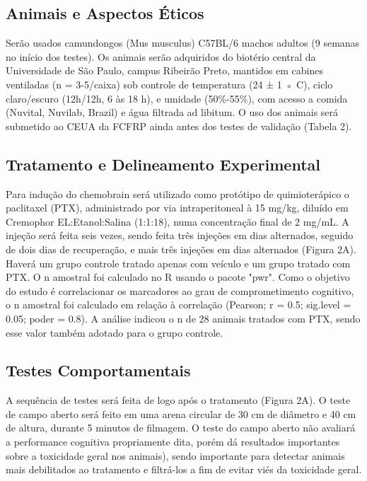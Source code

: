\documentclass[12pt,a4paper]{article}
\begin{document}
	
\subsection{Animais e Aspectos Éticos} \indent
	
Serão usados camundongos (Mus musculus) C57BL/6 machos adultos (9 semanas no início dos testes). Os animais serão adquiridos do biotério central da Universidade de São Paulo, campus Ribeirão Preto, mantidos em cabines ventiladas (n = 3-5/caixa) sob controle de temperatura (24 ± 1 ◦ C), ciclo claro/escuro (12h/12h, 6 às 18 h), e umidade (50\%-55\%), com acesso a comida (Nuvital, Nuvilab, Brazil) e água filtrada ad libitum. O uso dos animais será submetido ao CEUA da FCFRP ainda antes dos testes de validação (Tabela 2). \\
		
	
\subsection{Tratamento e Delineamento Experimental} \indent

Para indução do chemobrain será utilizado como protótipo de quimioterápico o paclitaxel (PTX), administrado por via intraperitoneal à 15 mg/kg, diluído em Cremophor EL:Etanol:Salina (1:1:18), numa concentração final de 2 mg/mL. A injeção será feita seis vezes, sendo feita três injeções em dias alternados, seguido de dois dias de recuperação, e mais três injeções em dias alternados (Figura 2A). \\
	
Haverá um grupo controle tratado apenas com veículo e um grupo tratado com PTX. O n amostral foi calculado no R usando o pacote "pwr". Como o objetivo do estudo é correlacionar os marcadores ao grau de comprometimento cognitivo, o n amostral foi calculado em relação à correlação (Pearson; r = 0.5; sig.level = 0.05; poder = 0.8). A análise indicou o n de 28 animais tratados com PTX, sendo esse valor também adotado para o grupo controle. \\
	
\subsection{Testes Comportamentais} \indent
	
A sequência de testes será feita de logo após o tratamento (Figura 2A). O teste de campo aberto será feito em uma arena circular de 30 cm de diâmetro e 40 cm de altura, durante 5 minutos de filmagem. O teste do campo aberto não avaliará a performance cognitiva propriamente dita, porém dá resultados importantes sobre a toxicidade geral nos animais), sendo importante para detectar animais mais debilitados ao tratamento e filtrá-los a fim de evitar viés da toxicidade geral.\\
	
\end{document}

